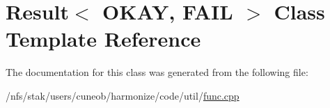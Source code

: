 \hypertarget{classResult}{\section{Result$<$ O\-K\-A\-Y, F\-A\-I\-L $>$ Class Template Reference}
\label{classResult}
}


The documentation for this class was generated from the following file\-:\begin{DoxyCompactItemize}
\item 
/nfs/stak/users/cuneob/harmonize/code/util/\hyperlink{func_8cpp}{func.\-cpp}\end{DoxyCompactItemize}
